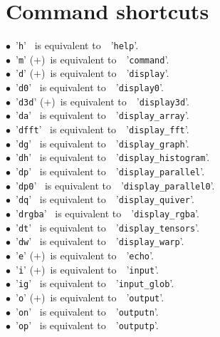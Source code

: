 \documentclass[a4paper,10.5pt,twoside]{book}
\newcommand{\Ca}[1]{\textcolor{ca}{#1}}
\begin{document}
\section{Command shortcuts}
$\bullet$~'\texttt{\Ca{h}}' ~is equivalent to~~'\texttt{\Ca{help}}'.\\
$\bullet$~'\texttt{\Ca{m}}' (+)~is equivalent to~~'\texttt{\Ca{command}}'.\\
$\bullet$~'\texttt{\Ca{d}}' (+)~is equivalent to~~'\texttt{\Ca{display}}'.\\
$\bullet$~'\texttt{\Ca{d0}}' ~is equivalent to~~'\texttt{\Ca{display0}}'.\\
$\bullet$~'\texttt{\Ca{d3d}}' (+)~is equivalent to~~'\texttt{\Ca{display3d}}'.\\
$\bullet$~'\texttt{\Ca{da}}' ~is equivalent to~~'\texttt{\Ca{display\_array}}'.\\
$\bullet$~'\texttt{\Ca{dfft}}' ~is equivalent to~~'\texttt{\Ca{display\_fft}}'.\\
$\bullet$~'\texttt{\Ca{dg}}' ~is equivalent to~~'\texttt{\Ca{display\_graph}}'.\\
$\bullet$~'\texttt{\Ca{dh}}' ~is equivalent to~~'\texttt{\Ca{display\_histogram}}'.\\
$\bullet$~'\texttt{\Ca{dp}}' ~is equivalent to~~'\texttt{\Ca{display\_parallel}}'.\\
$\bullet$~'\texttt{\Ca{dp0}}' ~is equivalent to~~'\texttt{\Ca{display\_parallel0}}'.\\
$\bullet$~'\texttt{\Ca{dq}}' ~is equivalent to~~'\texttt{\Ca{display\_quiver}}'.\\
$\bullet$~'\texttt{\Ca{drgba}}' ~is equivalent to~~'\texttt{\Ca{display\_rgba}}'.\\
$\bullet$~'\texttt{\Ca{dt}}' ~is equivalent to~~'\texttt{\Ca{display\_tensors}}'.\\
$\bullet$~'\texttt{\Ca{dw}}' ~is equivalent to~~'\texttt{\Ca{display\_warp}}'.\\
$\bullet$~'\texttt{\Ca{e}}' (+)~is equivalent to~~'\texttt{\Ca{echo}}'.\\
$\bullet$~'\texttt{\Ca{i}}' (+)~is equivalent to~~'\texttt{\Ca{input}}'.\\
$\bullet$~'\texttt{\Ca{ig}}' ~is equivalent to~~'\texttt{\Ca{input\_glob}}'.\\
$\bullet$~'\texttt{\Ca{o}}' (+)~is equivalent to~~'\texttt{\Ca{output}}'.\\
$\bullet$~'\texttt{\Ca{on}}' ~is equivalent to~~'\texttt{\Ca{outputn}}'.\\
$\bullet$~'\texttt{\Ca{op}}' ~is equivalent to~~'\texttt{\Ca{outputp}}'.\\
\end{document}
